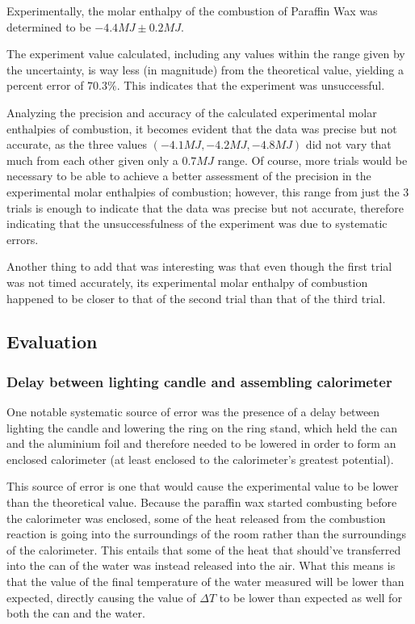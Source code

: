 \documentclass[
	letterpaper, %
	12pt, %
]{CSUniSchoolLabReport}
\begin{document}
\par Experimentally, the molar enthalpy of the combustion of Paraffin Wax was determined to
be $-4.4MJ \pm 0.2MJ$.

The experiment value calculated, including any values within the range given by the uncertainty,
is way less (in magnitude) from the theoretical value, yielding a percent error of $70.3\%$. This indicates
that the experiment was unsuccessful.

Analyzing the precision and accuracy of the calculated experimental molar enthalpies of combustion,
it becomes evident that the data was precise but not accurate, as the three values
$(-4.1MJ, -4.2MJ, -4.8MJ)$ did not vary that much from each other given only a
$0.7MJ$ range. Of course, more trials would be necessary to be able to achieve
a better assessment of the precision in the experimental molar enthalpies of combustion;
however, this range from just the 3 trials is enough to indicate that the data was precise
but not accurate, therefore indicating that the unsuccessfulness of the experiment was due
to systematic errors.

Another thing to add that was interesting was that even though the first trial was not timed
accurately, its experimental molar enthalpy of combustion happened to be closer to that of the
second trial than that of the third trial.

\subsection{Evaluation}

\subsubsection{Delay between lighting candle and assembling calorimeter}

One notable systematic source of error was the presence of a delay between lighting the candle and
lowering the ring on the ring stand, which held the can and the aluminium foil and therefore needed
to be lowered in order to form an enclosed calorimeter (at least enclosed to the calorimeter's greatest
potential).

This source of error is one that would cause the experimental value to be lower than the theoretical
value. Because the paraffin wax started combusting before the calorimeter was enclosed, some of the
heat released from the combustion reaction is going into the surroundings of the room rather than the
surroundings of the calorimeter. This entails that some of the heat that should've transferred into
the can of the water was instead released into the air. What this means is that the value of
the final temperature of the water measured will be lower than expected, directly causing the value of
$\Delta T$ to be lower than expected as well for both the can and the water.
\end{document}
